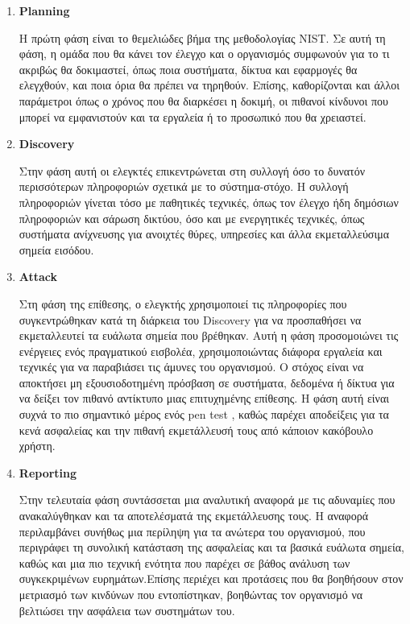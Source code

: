 \begin{enumerate}
    \item \textbf{\lt Planning}

    
Η πρώτη φάση είναι το θεμελιώδες βήμα της μεθοδολογίας  NIST. Σε αυτή τη φάση, η ομάδα που θα κάνει τον έλεγχο και ο οργανισμός συμφωνούν για το τι ακριβώς θα δοκιμαστεί, όπως ποια συστήματα, δίκτυα και εφαρμογές θα ελεγχθούν, και ποια όρια θα πρέπει να τηρηθούν. Επίσης, καθορίζονται και άλλοι παράμετροι όπως  ο χρόνος που θα διαρκέσει η δοκιμή, οι πιθανοί κίνδυνοι που μπορεί να εμφανιστούν και τα εργαλεία ή το προσωπικό που θα χρειαστεί.

    \item \textbf{\lt Discovery}

    
Στην φάση αυτή οι ελεγκτές επικεντρώνεται στη συλλογή όσο το δυνατόν περισσότερων πληροφοριών σχετικά με το σύστημα-στόχο. Η συλλογή πληροφοριών γίνεται  τόσο με παθητικές τεχνικές, όπως τον έλεγχο ήδη δημόσιων πληροφοριών και σάρωση δικτύου, όσο και με ενεργητικές τεχνικές, όπως συστήματα ανίχνευσης για ανοιχτές θύρες, υπηρεσίες και άλλα εκμεταλλεύσιμα σημεία εισόδου.

    \item \textbf{\lt Attack}

    
Στη φάση της επίθεσης, ο ελεγκτής χρησιμοποιεί τις πληροφορίες που συγκεντρώθηκαν κατά τη διάρκεια του \lt Discovery \gt για να προσπαθήσει να εκμεταλλευτεί τα ευάλωτα σημεία που βρέθηκαν. Αυτή η φάση προσομοιώνει τις ενέργειες ενός πραγματικού εισβολέα, χρησιμοποιώντας διάφορα εργαλεία και τεχνικές για να παραβιάσει τις άμυνες του οργανισμού. Ο στόχος είναι να αποκτήσει μη εξουσιοδοτημένη πρόσβαση σε συστήματα, δεδομένα ή δίκτυα για να δείξει τον πιθανό αντίκτυπο μιας επιτυχημένης επίθεσης. Η φάση αυτή είναι συχνά το πιο σημαντικό μέρος ενός \lt pen test \gt, καθώς παρέχει  αποδείξεις για τα κενά ασφαλείας και την πιθανή εκμετάλλευσή τους από κάποιον κακόβουλο χρήστη.
    \item \textbf{\lt Reporting}

    Στην τελευταία φάση  συντάσσεται μια αναλυτική αναφορά με τις αδυναμίες που ανακαλύγθηκαν και τα αποτελέσματά της εκμετάλλευσης τους. Η αναφορά περιλαμβάνει συνήθως μια  περίληψη για τα ανώτερα  του οργανισμού, που περιγράφει τη συνολική κατάσταση της ασφαλείας και τα βασικά ευάλωτα σημεία, καθώς και μια πιο τεχνική ενότητα που παρέχει σε βάθος ανάλυση των συγκεκριμένων ευρημάτων.Επίσης περιέχει και προτάσεις που θα βοηθήσουν στον μετριασμό των κινδύνων που εντοπίστηκαν, βοηθώντας τον οργανισμό να βελτιώσει την ασφάλεια των συστημάτων του.
\end{enumerate}



